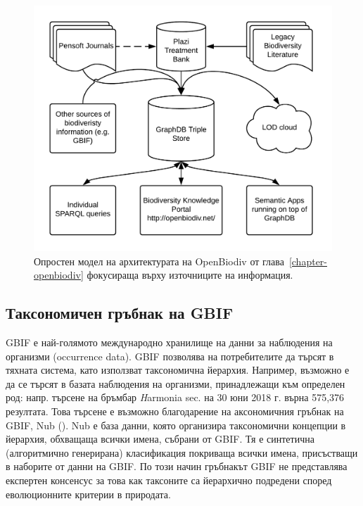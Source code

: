 \begin{figure}
\centering
\includegraphics[width=\textwidth]{Figures/openbiodiv-sources-simple}
\decoRule
\caption{Опростен модел на архитектурата на OpenBiodiv от глава~\ref{chapter-openbiodiv} фокусираща върху източниците на информация.}
\label{fig:openbiodiv-sources-simple}
\end{figure}


\subsection{Таксономичен гръбнак на GBIF}

GBIF е най-голямото международно хранилище на данни за наблюдения на организми (occurrence data). GBIF позволява на потребителите да търсят в тяхната система, като използват таксономична йерархия. Например, възможно е да се търсят в базата наблюдения на организми, принадлежащи към определен род: напр. търсене на бръмбар {\textit Harmonia} sec. \cite{gbif_secretariat_gbif_2017-1} на 30 юни 2018 г. върна 575,376 резултата. Това търсене е възможно благодарение на аксономичния гръбнак на GBIF, Nub (\cite{gbif_secretariat_gbif_2017-1}). Nub е база данни, която организира таксономични концепции в йерархия, обхващаща всички имена, събрани от GBIF. Тя е синтетична (алгоритмично генерирана) класификация покриваща всички имена, присъстващи в наборите от данни на GBIF. По този начин гръбнакът GBIF не представлява експертен консенсус за това как таксоните са йерархично подредени според еволюционните критерии в природата.

